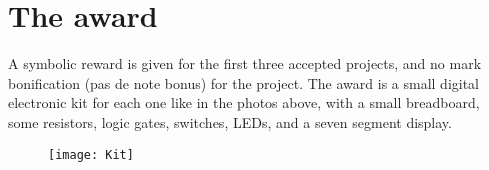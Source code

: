 \documentclass[a4paper, french, 12pt]{article}
\begin{document}
\newpage

\section{The award}

A symbolic reward is given for the first three accepted projects, and no mark bonification (pas de note bonus) for the project. The award is a small digital electronic kit for each one like in the photos above, with a small breadboard, some resistors, logic gates, switches, LEDs, and a seven segment display.

\begin{figure}[h]
    \centering
    \texttt{[image: Kit]}
\end{figure}

\vspace{20pt}

\hspace*{\fill} 
\end{document}
